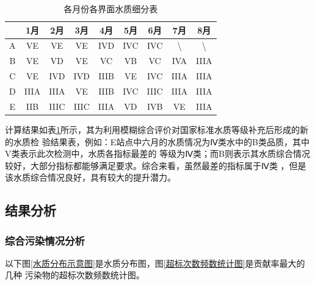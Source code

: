 \documentclass{whutmod}
\begin{document}
\begin{spacing}{1.2}
\begin{table}[htbp]
	\centering
	\caption{各月份各界面水质细分表}
	  \begin{tabular}{ccccccccc}\toprule[1.5pt]
		  & 1月   & 2月   & 3月   & 4月   & 5月   & 6月   & 7月   & 8月 \\ \hline
		  A   & VE  & VE  & VE  & IVD  & IVC  & IVC  & \textbackslash{} & \textbackslash{} \\
		  B   & VE  & VD  & VE  & VC  & VB  & VC  & IVA  & IIIA \\
		  C   & VE  & IVD  & IVD  & IIIB  & VE  & IVC  & IIIA  & IIIA \\
		  D   & IIIA  & IIIA  & VE  & IIIB  & IVC  & IIIC  & IIIA  & IIIA \\
		  E   & IIB  & IIIC  & IIIC  & IIIA  & VD  & IVB  & VE  & IIIA\\ \bottomrule[1.5pt]
	  \end{tabular}%
	\label{xifen}%
  \end{table}%
  
计算结果如表\ref{xifen}所示，其为利用模糊综合评价对国家标准水质等级补充后形成的新的水质检
验结果表，例如：E站点中六月的水质情况为Ⅳ类水中的B类品质，其中V类表示此次检测中，水质各指标最差的
等级为Ⅳ类；而B则表示其水质综合情况较好，大部分指标都能够满足要求。综合来看，虽然最差的指标属于Ⅳ类
，但是该水质综合情况良好，具有较大的提升潜力。

\subsection{结果分析}
\subsubsection{综合污染情况分析}
以下图\ref{水质分布示意图}是水质分布图，图\ref{超标次数频数统计图}是贡献率最大的几种
污染物的超标次数频数统计图。



\end{spacing}
\end{document}
